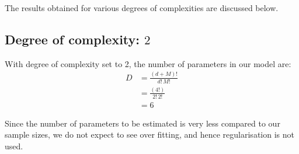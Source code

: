 \documentclass[12pt,a4paper]{article}
\newcommand{\noi}{\noindent}
\begin{document}
The results obtained for various degrees of complexities are discussed below. 

\subsection{Degree of complexity: $2$}
With degree of complexity set to 2, the number of parameters in our model are:
\begin{equation}
\begin{split}
 D &= \frac{(d+M)!}{d!\,M!} \\
   & =\frac{(4!)}{2!\,2!} \\
   & =6
\end{split}
\end{equation}

\noi
Since the number of parameters to be estimated is very less compared to our sample sizes, we do not expect to see over fitting, and hence regularisation is not used. 
\end{document}
